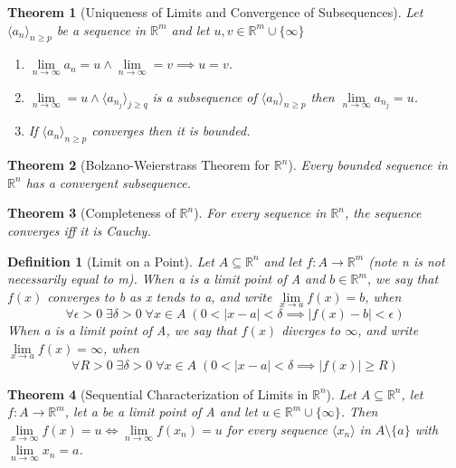 \documentclass[11pt, oneside]{book}
\theoremstyle{break}
\newtheorem{thm}{Theorem}[section]
\newtheorem{defn}{Definition}[section]
\newcommand{\bb}[1]{\mathbb{#1}}			%
\begin{document}
\begin{thm}[Uniqueness of Limits and Convergence of Subsequences]
	Let $\langle a_n \rangle_{n \geq p}$ be a sequence in $\bb{R}^m$ and let $u, v \in \bb{R}^m \cup \{\infty\}$
	\begin{enumerate}
		\item $\lim\limits_{n \to \infty} a_n = u \land \lim\limits_{n \to \infty} = v \implies u = v$.
		\item $\lim\limits_{n \to \infty} = u \land \langle a_{n_j} \rangle_{j \geq q}$ is a subsequence of $\langle a_n \rangle_{n \geq p}$ then $\lim\limits_{n \to \infty} a_{n_j} = u$.
		\item If $\langle a_n \rangle_{n \geq p}$ converges then it is bounded.
	\end{enumerate}
\end{thm}

\begin{thm}[Bolzano-Weierstrass Theorem for $\bb{R}^n$]
	Every bounded sequence in $\bb{R}^n$ has a convergent subsequence.
\end{thm}

\begin{thm}[Completeness of $\bb{R}^n$]\label{completeness_R}
	For every sequence in $\bb{R}^n$, the sequence converges iff it is Cauchy.
\end{thm}

\begin{defn}[Limit on a Point]
	Let $A \subseteq \bb{R}^n$ and let $f: A \to \bb{R}^m$ (note n is not necessarily equal to m). When a is a limit point of A and $b \in \bb{R}^m$, we say that $f(x)$ converges to b as x tends to a, and write $\lim\limits_{x \to a} f(x) = b$, when
	\begin{equation*}
		\forall \epsilon > 0 \; \exists \delta > 0 \; \forall x \in A \; (0 < |x - a| < \delta \implies |f(x) - b| < \epsilon)
	\end{equation*}
	When a is a limit point of A, we say that $f(x)$ diverges to $\infty$, and write $\lim\limits_{x \to a} f(x) = \infty$, when
	\begin{equation*}
		\forall R > 0 \; \exists \delta > 0 \; \forall x \in A \; (0 < |x - a| < \delta \implies |f(x)| \geq R)
	\end{equation*}
\end{defn}

\begin{thm}[Sequential Characterization of Limits in $\bb{R}^n$]
	Let $A \subseteq \bb{R}^n$, let $f: A \to \bb{R}^m$, let a be a limit point of A and let $u \in \bb{R}^m \cup \{\infty\}$. Then $\lim\limits_{x \to \infty} f(x) = u \iff \lim\limits_{n \to \infty} f(x_n) = u$ for every sequence $\langle x_n \rangle$ in $A \setminus \{a\}$ with $\lim\limits_{n \to \infty} x_n = a$.
\end{thm}
\end{document}
